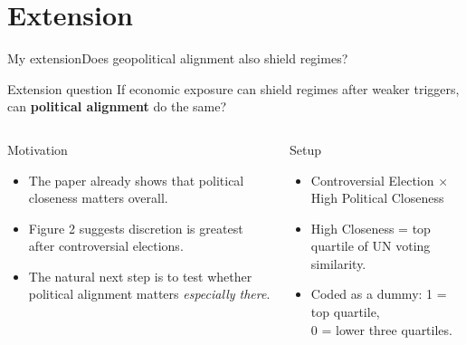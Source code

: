 \documentclass[
11pt,notheorems,hyperref={pdfauthor=Jakob}
]{beamer}
\begin{document}
	\section{Extension}
	
	\begin{frame}{My extension}{Does geopolitical alignment also shield regimes?}
		\begin{alertblock}{Extension question}
			If economic exposure can shield regimes after weaker triggers, can \textbf{political alignment} do the same?
		\end{alertblock}
		
		\vspace{0.4em}
		
		\begin{columns}[T,onlytextwidth]
			\begin{block}{Motivation}
				\begin{itemize}
					\item The paper already shows that political closeness matters overall.
					\item Figure 2 suggests discretion is greatest after controversial elections.
					\item The natural next step is to test whether political alignment matters \emph{especially there}.
				\end{itemize}
			\end{block}
			
			\begin{block}{Setup}
				\begin{itemize}
					\item Controversial Election $\times$ High Political Closeness
					\item High Closeness = top quartile of UN voting similarity.
					\item Coded as a dummy: 1 = top quartile,\\ 0 = lower three quartiles.
				\end{itemize}
			\end{block}
		\end{columns}
	\end{frame}
	
\end{document}
